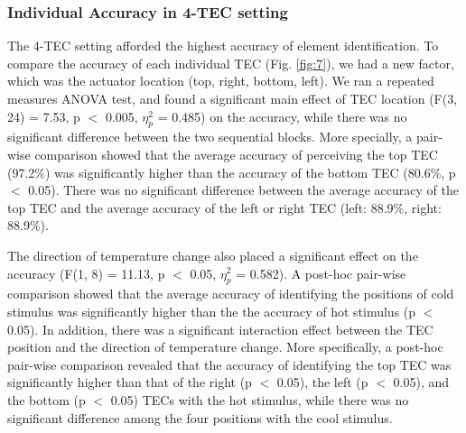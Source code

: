 \documentclass[preprint,12pt]{elsarticle}
\begin{document}
\subsubsection{Individual Accuracy in 4-TEC setting}
The 4-TEC setting afforded the highest accuracy of element identification. To compare the accuracy of each individual TEC (Fig. \ref{fig:7}), we had a new factor, which was the actuator location (top, right, bottom, left). We ran a repeated measures ANOVA test, and found a significant main effect of TEC location (F(3, 24) = 7.53, p $<$ 0.005, $\eta_p^2$ = 0.485) on the accuracy, while there was no significant difference between the two sequential blocks. More specially, a pair-wise comparison showed that the average accuracy of perceiving the top TEC (97.2\%) was significantly higher than the accuracy of the bottom TEC (80.6\%, p $<$ 0.05). There was no significant difference between the average accuracy of the top TEC and the average accuracy of the left or right TEC (left: 88.9\%, right: 88.9\%).

The direction of temperature change also placed a significant effect on the accuracy (F(1, 8) = 11.13, p $<$ 0.05, $\eta_p^2$ = 0.582). A post-hoc pair-wise comparison showed that the average accuracy of identifying the positions of cold stimulus was significantly higher than the the accuracy of hot stimulus (p $<$ 0.05). In addition, there was a significant interaction effect between the TEC position and the direction of temperature change. More specifically, a post-hoc pair-wise comparison revealed that the accuracy of identifying the top TEC was significantly higher than that of the right (p $<$ 0.05), the left (p $<$ 0.05), and the bottom (p $<$ 0.05) TECs with the hot stimulus, while there was no significant difference among the four positions with the cool stimulus.
\end{document}
